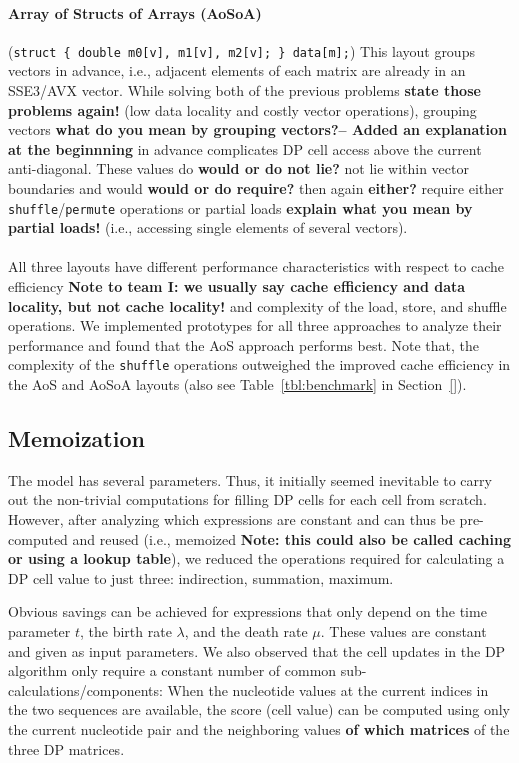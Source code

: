 \documentclass[runningheads,a4paper]{llncs}
\begin{document}
\paragraph*{Array of Structs of Arrays (AoSoA)} ({\small\texttt{struct \{ double m0[v],
m1[v], m2[v]; \} data[m];}}) This layout groups vectors in advance, i.e.,
adjacent elements of each matrix are already in an SSE3/AVX vector.  While solving both of the previous
problems {\bf state those problems again!} (low data locality and costly vector operations),
grouping vectors {\bf what do you mean by grouping vectors?}{\bf -- Added an
explanation at the beginnning} in advance complicates DP cell access above the current anti-diagonal.
These values do {\bf would or do not lie?} not lie within vector boundaries and would {\bf would or do require?} then
again {\bf either?} require either \texttt{shuffle}/\texttt{permute} operations
or partial loads {\bf explain what you mean by partial loads!} (i.e., accessing single elements of several vectors).

\paragraph*{} All three layouts have different performance characteristics with respect to
cache efficiency {\bf Note to team I: we usually say cache efficiency and data locality, but not cache locality!} 
and complexity of the load, store, and shuffle operations.
We implemented prototypes for all three approaches to analyze their
performance and found that the AoS approach performs best.  
Note that, the complexity of the \texttt{shuffle} operations outweighed the improved cache efficiency in the AoS and
AoSoA layouts (also see Table~\ref{tbl:benchmark} in Section~\ref{}). 


\subsection{Memoization}
\label{ssec:memo}

The \cite{TKF91} model has several parameters. Thus, it initially seemed inevitable to carry out the non-trivial computations for filling DP cells 
for each cell from scratch.
However, after analyzing which expressions are constant and can thus be pre-computed and reused (i.e., memoized {\bf Note: this could also be called caching or using a lookup table}), 
we reduced the operations required for calculating a DP cell value to just three: indirection, summation, maximum.

Obvious savings can be achieved for expressions that only depend on the time parameter $t$, 
the birth rate $\lambda$, and the death rate $\mu$.
These values are constant and given as input parameters. 
We also observed that the cell updates in the DP algorithm only require a constant number of common sub-calculations/components: 
When the nucleotide values at the current indices in the two sequences are available, 
the score (cell value) can be computed using only the current nucleotide pair and the 
neighboring values {\bf of which matrices} of the three DP matrices.
\end{document}
